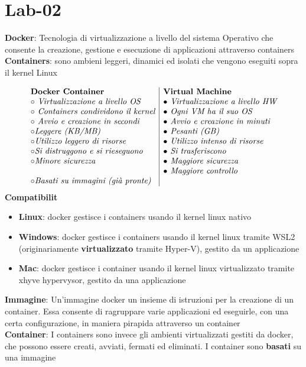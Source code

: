 \section{Lab-02}
\begin{flushleft}
  \textbf{Docker}: Tecnologia di virtualizzazione a livello del sistema Operativo che 
  consente la creazione, gestione e esecuzione di applicazioni attraverso containers \\
  \textbf{Containers}: sono ambieni leggeri, dinamici ed isolati che vengono eseguiti sopra 
  il kernel Linux\par 
  $$\begin{array}{l|l}
    \textbf{Docker Container} & \textbf{Virtual Machine} \\
    \circ \textit{ Virtualizzazione a livello OS} & \bullet \textit{ Virtualizzazione a livello HW}\\ 
    \circ \textit{ Containers condividono il kernel} & \bullet \textit{ Ogni VM ha il suo OS}\\
    \circ \textit{ Avvio e creazione in secondi } & \bullet \textit{ Avvio e creazione in minuti}\\
    \circ \textit{Leggere (KB/MB)} & \bullet \textit{ Pesanti (GB)}\\
    \circ \textit{Utilizzo leggero di risorse} & \bullet \textit{ Utilizzo intenso di risorse}\\
    \circ \textit{Si distruggono e si rieseguono} & \bullet \textit{ Si trasferiscono}\\ 
    \circ \textit{Minore sicurezza} & \bullet \textit{ Maggiore sicurezza}\\
    & \bullet \textit{ Maggiore controllo} \\
    \circ \textit{Basati su immagini (gi\`a pronte)} & \\
  \end{array}$$
  \textbf{Compatibilit\aca}
  \begin{itemize}
    \item \textbf{Linux}: docker gestisce i containers usando il kernel linux nativo
    \item \textbf{Windows}: docker gestisce i containers usando il kernel linux tramite WSL2
            (originariamente \textbf{virtualizzato} tramite Hyper-V), gestito da un applicazione
    \item \textbf{Mac}: docker gestisce i container usando il kernel linux virtualizzato tramite xhyve hypervysor, 
          gestito da una applicazione
  \end{itemize}
  \textbf{Immagine}: Un'immagine docker \ace un insieme di istruzioni per la creazione di un 
  container. Essa consente di ragruppare varie applicazioni ed eseguirle, con una certa configurazione, 
  in maniera pi\acu rapida attraverso un container \\ 
  \textbf{Container}: I containers sono invece gli ambienti virtualizzati gestiti da docker, che possono essere creati, 
  avviati, fermati ed eliminati. I container sono \textbf{basati} su una immagine
\end{flushleft}
